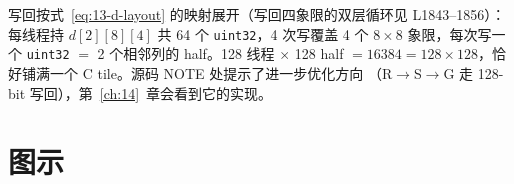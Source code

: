 



写回按式~\ref{eq:13-d-layout} 的映射展开（写回四象限的双层循环见 L1843--1856）：
每线程持 $d[2][8][4]$ 共 64 个
\texttt{uint32}，4 次写覆盖 4 个 $8 \times 8$ 象限，每次写一个
\texttt{uint32} $=$ 2 个相邻列的 half。128 线程 $\times$ 128 half $= 16384 =
128 \times 128$，恰好铺满一个 C tile。源码 NOTE 处提示了进一步优化方向
（R$\to$S$\to$G 走 128-bit 写回），第~\ref{ch:14}~章会看到它的实现。

\needspace{79mm}

\section{图示}


